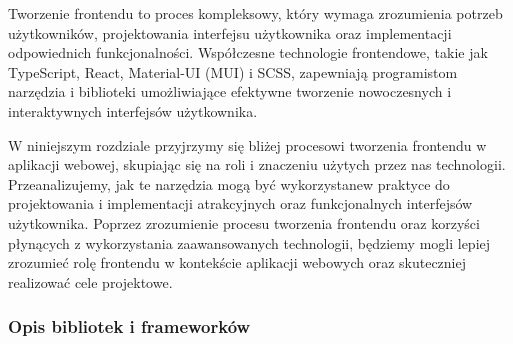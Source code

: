 Tworzenie frontendu to proces kompleksowy, który wymaga zrozumienia potrzeb użytkowników, projektowania interfejsu użytkownika oraz implementacji odpowiednich funkcjonalności. Współczesne technologie frontendowe, takie jak TypeScript, React, Material-UI (MUI) i SCSS, zapewniają programistom narzędzia i biblioteki umożliwiające efektywne tworzenie nowoczesnych i interaktywnych interfejsów użytkownika.

W niniejszym rozdziale przyjrzymy się bliżej procesowi tworzenia frontendu w aplikacji webowej, skupiając się na roli i znaczeniu użytych przez nas technologii. Przeanalizujemy, jak te narzędzia mogą być wykorzystane\linebreak w praktyce do projektowania i implementacji atrakcyjnych oraz funkcjonalnych interfejsów użytkownika. Poprzez zrozumienie procesu tworzenia frontendu oraz korzyści płynących z wykorzystania zaawansowanych technologii, będziemy mogli lepiej zrozumieć rolę frontendu w kontekście aplikacji webowych oraz skuteczniej realizować cele projektowe.

\subsubsection{Opis bibliotek i frameworków}

